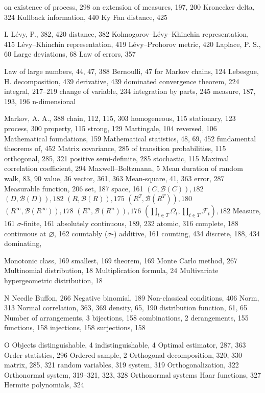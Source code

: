 on existence of process, 298
on extension of measures, 197, 200
Kronecker delta, 324
Kullback information, 440
Ky Fan distance, 425

L
Lévy, P., 382, 420
distance, 382
Kolmogorov–Lévy–Khinchin representation, 415
Lévy–Khinchin representation, 419
Lévy–Prohorov metric, 420
Laplace, P. S., 60
Large deviations, 68
Law of errors, 357

Law of large numbers, 44, 47, 388
Bernoulli, 47
for Markov chains, 124
Lebesgue, H.
decomposition, 439
derivative, 439
dominated convergence theorem, 224
integral, 217–219
change of variable, 234
integration by parts, 245
measure, 187, 193, 196
n-dimensional

Markov, A. A., 388
chain, 112, 115, 303
homogeneous, 115
stationary, 123
process, 300
property, 115
strong, 129
Martingale, 104
reversed, 106
Mathematical foundations, 159
Mathematical statistics, 48, 69, 452
fundamental theorems of, 452
Matrix
covariance, 285
of transition probabilities, 115
orthogonal, 285, 321
positive semi-definite, 285
stochastic, 115
Maximal correlation coefficient, 294
Maxwell–Boltzmann, 5
Mean
duration of random walk, 83, 90
value, 36
vector, 361, 363
Mean-square, 41, 363
error, 287
Measurable
function, 206
set, 187
space, 161
$(C, \mathcal{B}(C)), 182$
$(D, \mathcal{B}(D)), 182$
$(R, \mathcal{B}(R)), 175$
$(R^T, \mathcal{B}(R^T)), 180$
$(R^\infty, \mathcal{B}(R^\infty)), 178$
$(R^n, \mathcal{B}(R^n)), 176$
$(\prod_{t \in T} \Omega_t, \prod_{t \in T} \mathcal{F}_t), 182$
Measure, 161
$\sigma$-finite, 161
absolutely continuous, 189, 232
atomic, 316
complete, 188
continuous at $\varnothing$, 162
countably ($\sigma$-) additive, 161
counting, 434
discrete, 188, 434
dominating,

Monotonic class, 169
smallest, 169
theorem, 169
Monte Carlo method, 267
Multinomial distribution, 18
Multiplication formula, 24
Multivariate hypergeometric distribution, 18

N
Needle
Buffon, 266
Negative binomial, 189
Non-classical conditions, 406
Norm, 313
Normal
correlation, 363, 369
density, 65, 190
distribution function, 61, 65
Number of
arrangements, 3
bijections, 158
combinations, 2
derangements, 155
functions, 158
injections, 158
surjections, 158

O
Objects
distinguishable, 4
indistinguishable, 4
Optimal estimator, 287, 363
Order statistics, 296
Ordered sample, 2
Orthogonal
decomposition, 320, 330
matrix, 285, 321
random variables, 319
system, 319
Orthogonalization, 322
Orthonormal system, 319–321, 323, 328
Orthonormal systems
Haar functions, 327
Hermite polynomials, 324

